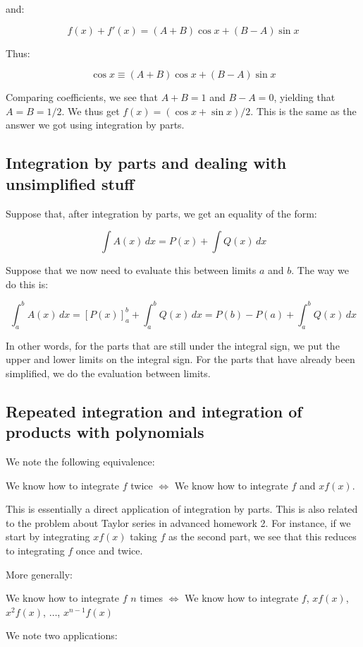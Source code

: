 \documentclass{amsart}
\begin{document}
and:

$$f(x) + f'(x) = (A + B) \cos x + (B - A)\sin x$$

Thus:

$$\cos x \equiv (A + B) \cos x + (B - A) \sin x$$

Comparing coefficients, we see that $A + B = 1$ and $B - A = 0$,
yielding that $A = B = 1/2$. We thus get $f(x) = (\cos x + \sin
x)/2$. This is the same as the answer we got using integration by
parts.

\subsection{Integration by parts and dealing with unsimplified stuff}

Suppose that, after integration by parts, we get an equality of the form:

$$\int A(x) \, dx = P(x) + \int Q(x) \, dx$$

Suppose that we now need to evaluate this between limits $a$ and
$b$. The way we do this is:

$$\int_a^b A(x) \, dx = [P(x)]_a^b + \int_a^b Q(x) \, dx = P(b) - P(a) + \int_a^b Q(x) \, dx$$

In other words, for the parts that are still under the integral sign,
we put the upper and lower limits on the integral sign. For the parts
that have already been simplified, we do the evaluation between
limits.

\subsection{Repeated integration and integration of products with polynomials}

We note the following equivalence:

We know how to integrate $f$ twice $\iff$ We know how to integrate $f$
and $xf(x)$.

This is essentially a direct application of integration by parts. This
is also related to the problem about Taylor series in advanced
homework 2. For instance, if we start by integrating $xf(x)$ taking
$f$ as the second part, we see that this reduces to integrating $f$
once and twice.

More generally:

We know how to integrate $f$ $n$ times $\iff$ We know how to integrate
$f$, $xf(x)$, $x^2f(x)$, $\dots$, $x^{n-1}f(x)$

We note two applications:
\end{document}
